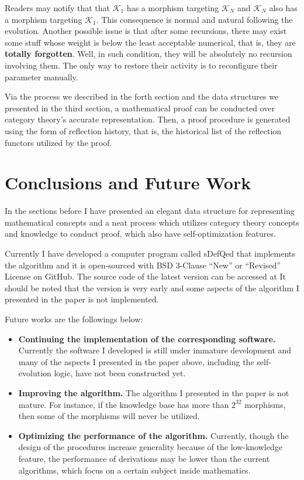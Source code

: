 \documentclass{article}
\begin{document}
Readers may notify that that \(\mathcal{K}_1\) has a morphism targeting \(\mathcal{K}_N\) and \(\mathcal{K}_N\) also has a morphism targeting \(\mathcal{K}_1\). This consequence is normal and natural following the evolution. Another possible issue is that after some recursions, there may exist some stuff whose weight is below the least acceptable numerical, that is, they are \textbf{totally forgotten}. Well, in such condition, they will be absolutely no recursion involving them. The only way to restore their activity is to reconfigure their parameter manually.

Via the process we described in the forth section and the data structures we presented in the third section, a mathematical proof can be conducted over category theory{'}s accurate representation. Then, a proof procedure is generated using the form of reflection history, that is, the historical list of the reflection functors utilized by the proof.

\section*{Conclusions and Future Work}

In the sections before I have presented an elegant data structure for representing mathematical concepts and a neat process which utilizes category theory concepts and knowledge to conduct proof, which also have self-optimization features.

Currently I have developed a computer program called sDefQed that implements the algorithm and it is open-sourced with BSD 3-Clause {``}New{''} or {``}Revised{''} License on GitHub. The source code of the latest version can be accessed at \cite{7} It should be noted that the version is very early and some aspects of the algorithm I presented in the paper is not implemented.

Future works are the followings below:
\begin{itemize}
	\item \textbf{Continuing the implementation of the corresponding software.} Currently the software I developed is still under immature development and many of the aspects I presented in the paper above, including the self-evolution logic, have not been constructed yet.
	\item  \textbf{Improving the algorithm.} The algorithm I presented in the paper is not mature. For instance, if the knowledge base has more than \(2^{32}\) morphisms, then some of the morphisms will never be utilized.
	\item \textbf{Optimizing the performance of the algorithm.} Currently, though the design of the procedures increase generality because of the low-knowledge feature, the performance of derivations may be lower than the current algorithms, which focus on a certain subject inside mathematics.
\end{itemize}
\end{document}
